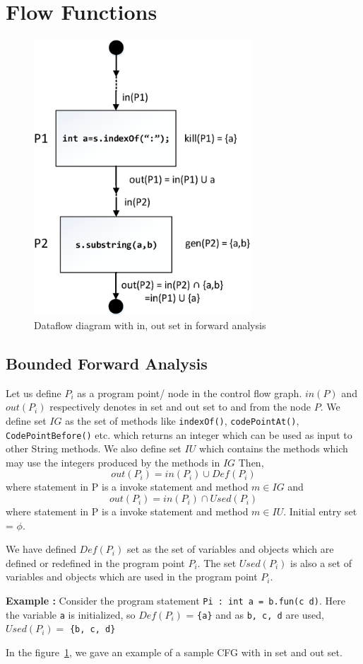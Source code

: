 \section{Flow Functions}
\label{sec:flowFunctions}

\begin{figure}[f]
\centering
\includegraphics[width=3.2in]{images/dataflow.png}
\caption{Dataflow diagram with in, out set in forward analysis}
\label{fig:dataflow}
\end{figure}

\subsection{Bounded Forward Analysis}
\label{subsec:boundedForward}

Let us define $P_i$ as a program point/ node in the control flow graph. $in(P)$
and $out(P_i)$ respectively denotes in set and out set to and from the node $P$.
We define set $IG$ as the set of methods like \texttt{indexOf()},
\texttt{codePointAt()}, \texttt{CodePointBefore()} etc. which returns an integer
which can be used as input to other String methods. We also define set $IU$
which contains the methods which may use the integers produced by the methods in
$IG$ Then, 
$$out(P_i) = in(P_i) \cup Def(P_i)$$ where statement in P is a invoke statement
and method $m \in IG$ and
$$out(P_i) = in(P_i) \cap Used(P_i)$$ where statement in P is a invoke statement
and method $m \in IU$. Initial entry set = ${\phi}$.


We have defined $Def(P_i)$ set as the set of variables and objects which are
defined or redefined in the program point $P_i$. The set $Used(P_i)$ is also a
set of variables and objects which are used in the program point $P_i$.

\textbf{Example : } Consider the program statement \texttt{Pi : int a = b.fun(c
d)}.
Here the variable \texttt{a} is initialized, so $Def(P_i)$ = \texttt{\{a\}} and
as
\texttt{b, c, d} are used, $Used(P_i) =$ \texttt{\{b, c, d\}}

In the figure~\ref{fig:dataflow}, we gave an example of a sample CFG with in set
and out set.
